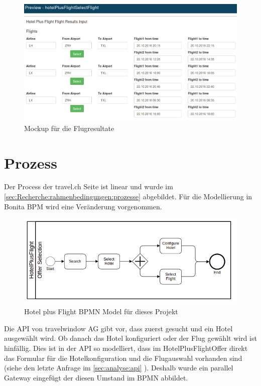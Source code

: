 \begin{figure}[H]
	\centering
	\includegraphics[width=1\textwidth]{images/forms-select-flight.png}
	\caption{Mockup für die Flugresultate}
	\label{fig:konzept:mockups:selectflight}
\end{figure}


\section{Prozess}
\label{sec:konzept:prozess}
Der Process der travel.ch Seite ist linear und wurde im \cref{sec:Recherche:rahmenbedingungen:prozesse}  abgebildet. Für die Modellierung in Bonita BPM wird eine Veränderung vorgenommen.
\begin{figure}[H]
	\centering
	\includegraphics[width=1\textwidth]{images/hotelplusflightbonita.png}
	\caption{Hotel plus Flight BPMN Model für dieses Projekt}
	\label{fig:konzept:mockups:selectflight}
\end{figure}
Die API von travelwindow AG gibt vor, dass zuerst gesucht und ein Hotel ausgewählt wird. Ob danach das Hotel konfiguriert oder der Flug gewählt wird ist hinfällig. Dies ist in der API so modelliert, dass im HotelPlusFlightOffer direkt das Formular für die Hotelkonfiguration und die Flugauswahl vorhanden sind (siehe den letzte Anfrage im \cref{sec:analyse:api} ). Deshalb wurde ein parallel Gateway eingefügt der diesen Umstand im BPMN abbildet.